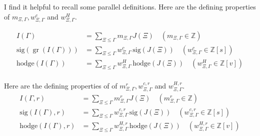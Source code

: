 \documentclass[12pt,leqno]{article}
\newtheorem{lemma}[equation]{Lemma}
\newcommand{\sig}{\text{sig}}
\newcommand{\hodge}{\text{hodge}}
\DeclareMathOperator{\gr}{\text{gr}}
\newcommand{\Z}{\mathbb Z}
\begin{document}



I find it helpful  to recall some parallel definitions. Here are the defining properties
of $m_{\Xi,\Gamma}, w^c_{\Xi,\Gamma}$ and $w^H_{\Xi,\Gamma}$.

\begin{equation}
\label{e:parallel}
\begin{aligned}
I(\Gamma)&=\sum_{\Xi\le\Gamma} m_{\Xi,\Gamma}J(\Xi)\quad (m_{\Xi,\Gamma}\in\Z)\\
\sig(\gr(I(\Gamma)))&=\sum_{\Xi\le\Gamma} w^c_{\Xi,\Gamma}\,\sig(J(\Xi))\quad (w^c_{\Xi,\Gamma}\in\Z[s])\\
\hodge(I(\Gamma))&=\sum_{\Xi\le\Gamma}w^H_{\Xi,\Gamma}\,\hodge(J(\Xi))\quad (w^H_{\Xi,\Gamma}\in\Z[v])\\
\end{aligned}
\end{equation}

Here are the defining properties of of $m^r_{\Xi,\Gamma}, w^{c,r}_{\Xi,\Gamma}$ and $w^{H,r}_{\Xi,\Gamma}$.
\begin{equation}
\label{e:parallelgraded}
\begin{aligned}
I(\Gamma,r)&=\sum_{\Xi\le\Gamma} m^r_{\Xi,\Gamma}J(\Xi)\quad (m^r_{\Xi,\Gamma}\in\Z)\\
\sig(I(\Gamma),r)&=\sum_{\Xi\le\Gamma} w^{c,r}_{\Xi,\Gamma}\,\sig(J(\Xi))\quad (w^{c,r}_{\Xi,\Gamma}\in\Z[s])\\
\hodge(I(\Gamma),r)&=\sum_{\Xi\le\Gamma}w^{H,r}_{\Xi,\Gamma}\,\hodge(J(\Xi))\quad (w^{H,r}_{\Xi,\Gamma}\in\Z[v])\\
\end{aligned}
\end{equation}
\end{document}
